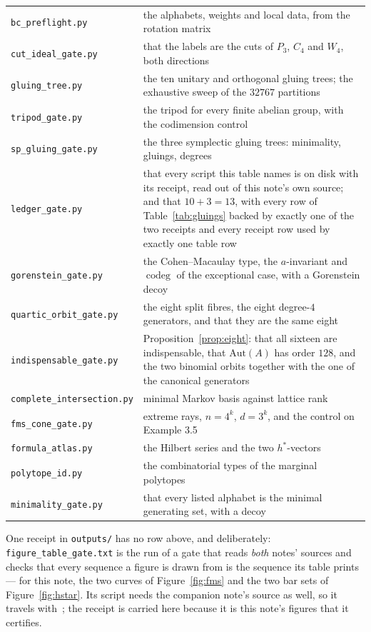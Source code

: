 \documentclass[11pt,a4paper]{article}
\theoremstyle{definition}
\begin{document}
{\begin{longtable}{p{5.4cm}p{9.4cm}}
\texttt{bc\_preflight.py} & the alphabets, weights and local data, from the rotation matrix\\
\rowcolor{softgrey}
\texttt{cut\_ideal\_gate.py} & that the labels are the cuts of $P_3$, $C_4$ and $W_4$, both
directions\\
\texttt{gluing\_tree.py} & the ten unitary and orthogonal gluing trees; the exhaustive sweep of
the $32767$ partitions\\
\rowcolor{softgrey}
\texttt{tripod\_gate.py} & the tripod for every finite abelian group, with the codimension control\\
\texttt{sp\_gluing\_gate.py} & the three symplectic gluing trees: minimality, gluings, degrees\\
\rowcolor{softgrey}
\texttt{ledger\_gate.py} & that every script this table names is on disk with its receipt,
read out of this note's own source; and that $10+3=13$, with every row of
Table~\ref{tab:gluings} backed by exactly one of the two receipts and every receipt row used by
exactly one table row\\
\texttt{gorenstein\_gate.py} & the Cohen--Macaulay type, the $a$-invariant and $\operatorname{codeg}$
of the exceptional case, with a Gorenstein decoy\\
\rowcolor{softgrey}
\texttt{quartic\_orbit\_gate.py} & the eight split fibres, the eight degree-$4$ generators, and
that they are the same eight\\
\texttt{indispensable\_gate.py} & Proposition~\ref{prop:eight}: that all sixteen are
indispensable, that $\mathrm{Aut}(A)$ has order $128$, and the two binomial orbits together with
the one of the canonical generators\\
\rowcolor{softgrey}
\texttt{complete\_intersection.py} & minimal Markov basis against lattice rank\\
\texttt{fms\_cone\_gate.py} & extreme rays, $n=4^k$, $d=3^k$, and the control on Example 3.5\\
\rowcolor{softgrey}
\texttt{formula\_atlas.py} & the Hilbert series and the two $h^*$-vectors\\
\texttt{polytope\_id.py} & the combinatorial types of the marginal polytopes\\
\rowcolor{softgrey}
\texttt{minimality\_gate.py} & that every listed alphabet is the minimal generating set, with a decoy\\
\bottomrule
\end{longtable}}

\noindent
One receipt in \texttt{outputs/} has no row above, and deliberately: \texttt{figure\_table\_gate.txt}
is the run of a gate that reads \emph{both} notes' sources and checks that every sequence a figure
is drawn from is the sequence its table prints --- for this note, the two curves of
Figure~\ref{fig:fms} and the two bar sets of Figure~\ref{fig:hstar}. Its script needs the companion
note's source as well, so it travels with~\cite{IXA}; the receipt is carried here because it is this
note's figures that it certifies.
\end{document}
